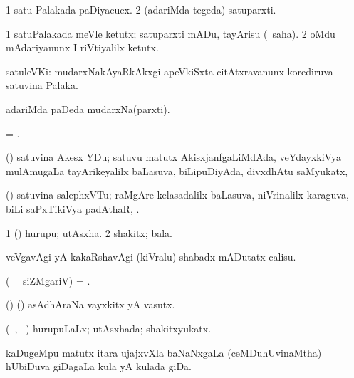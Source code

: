\bentry
{} 
\gl{\nA} 
\bmng
\bnum
\num{1} satu Palakada paDiyacucx. 
\num{2} (adariMda tegeda) satuparxti.
\enum
\emng
\eentry

\bentry 
{} 
\gl{\sakirx} 
\bmng
\bnum
\num{1} satuPalakada meVle ketutx; satuparxti mADu, tayArisu (\akirx\ saha). 
\num{2} oMdu mAdariyanunx I riVtiyalilx ketutx.
\enum
\emng
\eentry

\bentry
{} 
\gl{\nA} 
\bmng
satuleVKi: 
\banum
{} mudarxNakAyaRkAkxgi apeVkiSxta citAtxravanunx korediruva satuvina Palaka. 

 adariMda paDeda mudarxNa(parxti).
\eanum
\emng 
\eentry

\bentry
{} 
\gl{\nA} 
\bmng
= .
\emng
\eentry

\bentry
{}  
\gl{\nA} 
\bmng
(\ravi) satuvina Akesx YDu; satuvu matutx AkisxjanfgaLiMdAda, veYdayxkiVya mulAmugaLa tayArikeyalilx baLasuva, biLipuDiyAda, divxdhAtu saMyukatx, 
\emng
\eentry

\bentry
{}  
\gl{\nA}  
\bmng
(\ravi) satuvina salephxVTu; raMgAre kelasadalilx baLasuva, niVrinalilx karaguva, biLi saPxTikiVya padAthaR, .
\emng
\eentry

\bentry
{} 
\gl{\nA}
\bmng
\bnum
\num{1} (\AmA) hurupu; utAsxha. 
\num{2} shakitx; bala.
\enum
\emng
\eentry

\bentry
{} 
\gl{\akirx} 
\bmng
veVgavAgi yA kakaRshavAgi (kiVralu) shabadx mADutatx calisu.
\emng
\eentry

\bentry
{} 
\gl{\nA} 
\bmng
(\bava\  \ucAcx\ siZMgariV)
= .
\emng
\eentry

\bentry
{} 
\gl{\nA}  
\bmng
(\ame) (\ashi) asAdhAraNa vayxkitx yA vasutx.
\emng
\eentry

\bentry
{} 
\gl{\gu} 
\bmng
(\tara\ , \tama\ )
hurupuLaLx; utAsxhada; shakitxyukatx.
\emng
\eentry

\bentry
{} 
\gl{\nA} 
\bmng
kaDugeMpu matutx itara ujajxvXla baNaNxgaLa (ceMDuhUvinaMtha) hUbiDuva  giDagaLa kula yA kulada giDa.
\emng
\eentry

